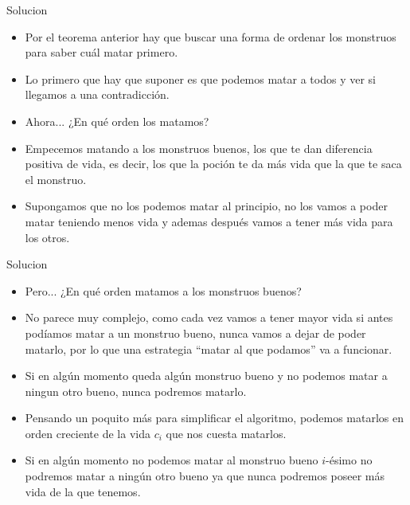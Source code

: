 \documentclass{beamer}
\begin{document}
\begin{frame}{Solucion}
  \begin{itemize}
    \item Por el teorema anterior hay que buscar una forma de ordenar los
      monstruos para saber cuál matar primero.\pause
    \item Lo primero que hay que suponer es que podemos matar a todos
      y ver si llegamos a una contradicción.\pause
    \item Ahora... ¿En qué orden los matamos?\pause
    \item Empecemos matando a los monstruos buenos, los que te dan
      diferencia positiva de vida, es decir, los que la poción te da más
      vida que la que te saca el monstruo.\pause
    \item Supongamos que no los podemos matar al principio, no los
      vamos a poder matar teniendo menos vida y ademas después vamos 
      a tener más vida para los otros.
  \end{itemize}
\end{frame}

\begin{frame}{Solucion}
  \begin{itemize}
    \item Pero... ¿En qué orden matamos a los monstruos buenos?
    \item No parece muy complejo, como cada vez vamos a tener mayor
      vida si antes podíamos matar a un monstruo bueno, nunca
      vamos a dejar de poder matarlo, por lo que una estrategia “matar
      al que podamos” va a funcionar.
    \item Si en algún momento queda algún monstruo bueno y no podemos
      matar a ningun otro bueno, nunca podremos matarlo.
    \item Pensando un poquito más para simplificar el algoritmo, podemos
      matarlos en orden creciente de la vida $c_i$ que nos cuesta matarlos.
    \item Si en algún momento no podemos matar al monstruo bueno
      $i$-ésimo no podremos matar a ningún otro bueno ya que nunca
      podremos poseer más vida de la que tenemos.
  \end{itemize}
\end{frame}
\end{document}
